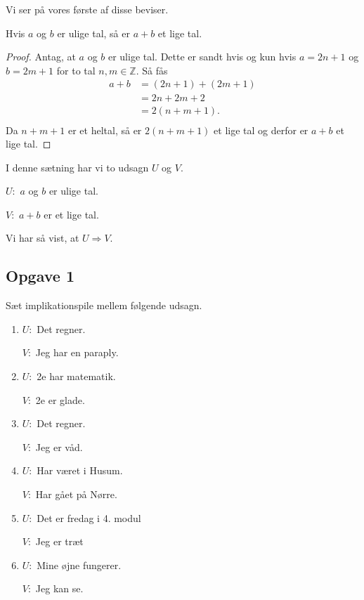 Vi ser på vores første af disse beviser.
\begin{setn}
	Hvis $a$ og $b$ er ulige tal, så er $a + b$ et lige tal. 
\end{setn}
\begin{proof}
	Antag, at $a$ og $b$ er ulige tal. Dette er sandt hvis og kun hvis $a = 2n + 1$ og $b = 2m + 1$ for to tal $n,m
	\in\mathbb{Z}$. Så fås
	\begin{align*}
		a + b &= (2n + 1) + (2m + 1)\\
		&= 2n + 2m + 2\\ 
		&= 2(n+m+1).\\
	\end{align*}
	Da $n+m+1$ er et heltal, så er $2(n+m+1)$ et lige tal og derfor er $a + b$ et lige tal. 
\end{proof}

I denne sætning har vi to udsagn $U$ og $V$. 

$U:$ $a$ og $b$ er ulige tal.

$V:$ $a + b$ er et lige tal. 

Vi har så vist, at $U \Rightarrow V$. 


\newpage
\subsection*{Opgave 1}

Sæt implikationspile mellem følgende udsagn.

\begin{enumerate}[label=\roman*)]
	\item $U:$ Det regner.
	
	$V:$ Jeg har en paraply.
	\item $U:$ 2e har matematik.
	
	$V:$ 2e er glade.
	\item $U:$ Det regner.
	
	$V:$ Jeg er våd.
	\item $U:$ Har været i Husum.
	
	$V:$ Har gået på Nørre.
	\item $U:$ Det er fredag i 4. modul
	
	$V:$ Jeg er træt
	\item $U:$ Mine øjne fungerer.
	
	$V:$ Jeg kan se. 
\end{enumerate}

\newpage

